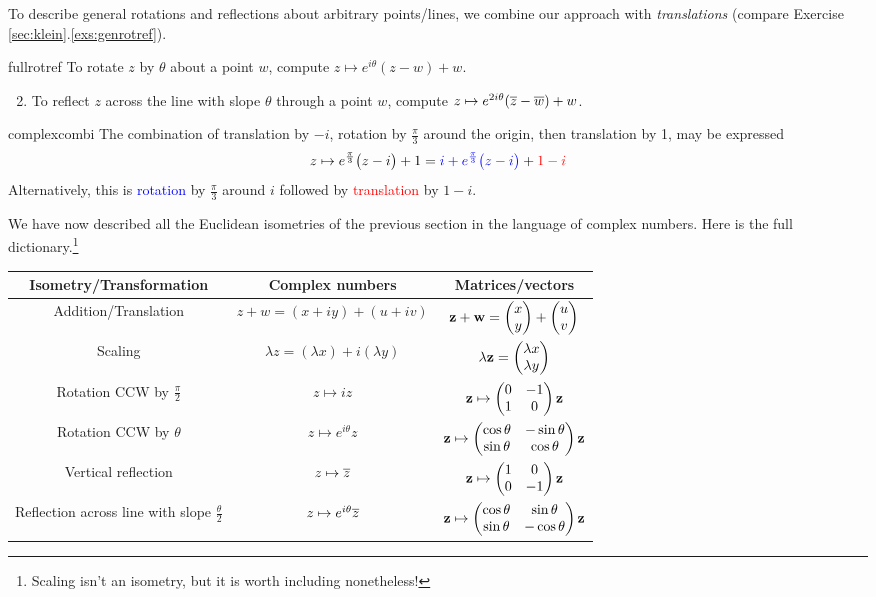 To describe general rotations and reflections about arbitrary points/lines, we combine our approach with \emph{translations} (compare Exercise \ref*{sec:klein}.\ref{exs:genrotref}).


\begin{cor}{}{fullrotref}
\exstart To rotate $z$ by $\theta$ about a point $w$, compute $z\mapsto e^{i\theta}(z-w)+w$.
\begin{enumerate}\setcounter{enumi}{1}
  \item To reflect $z$ across the line with slope $\theta$ through a point $w$, compute $z\mapsto e^{2i\theta}(\overline{z}-\overline{w})+w$.
\end{enumerate}
\end{cor}

\begin{example}{}{complexcombi}
The combination of translation by $-i$, rotation by $\frac\pi 3$ around the origin, then translation by 1, may be expressed
\[z\mapsto e^{\frac\pi 3}\bigl(z-i\bigr)+1=\textcolor{blue}{i+e^{\frac\pi 3}\bigl(z-i\bigr)}+\textcolor{red}{1-i}\]
Alternatively, this is \textcolor{blue}{rotation} by $\frac\pi 3$ around $i$ followed by \textcolor{red}{translation} by $1-i$.
\end{example}

\bigskip


We have now described all the Euclidean isometries of the previous section in the language of complex numbers. Here is the full dictionary.\footnote{Scaling isn't an isometry, but it is worth including nonetheless!}
\begin{center}
\begin{tabular}{c|c|c}
Isometry/Transformation&Complex numbers&Matrices/vectors\\\hline
Addition/Translation&$z+w=(x+iy)+(u+iv)$&${\mathbf{z}}+{\mathbf{w}}=\begin{pmatrix}x\\y\end{pmatrix}+\begin{pmatrix}u\\v\end{pmatrix}$\\
Scaling&$\lambda z=(\lambda x)+i(\lambda y)$&$\lambda{\mathbf{z}}=\begin{pmatrix}\lambda x\\\lambda y\end{pmatrix}$\\
Rotation CCW by $\frac\pi 2$&$z\mapsto iz$&${\mathbf{z}}\mapsto\begin{pmatrix}
0&-1\\
1&0
\end{pmatrix}{\mathbf{z}}$\\
Rotation CCW by $\theta$&$z\mapsto e^{i\theta}z$&${\mathbf{z}}\mapsto\begin{pmatrix}
\cos\theta&-\sin\theta\\
\sin\theta&\cos\theta
\end{pmatrix}{\mathbf{z}}$\\
Vertical reflection&$z\mapsto \overline{z}$&${\mathbf{z}}\mapsto\begin{pmatrix}
1&0\\
0&-1
\end{pmatrix}{\mathbf{z}}$\\
Reflection across line with slope $\frac\theta 2$&$z\mapsto e^{i\theta}\overline{z}$&${\mathbf{z}}\mapsto\begin{pmatrix}
\cos\theta&\sin\theta\\
\sin\theta&-\cos\theta
\end{pmatrix}{\mathbf{z}}$
\end{tabular}
\end{center}

